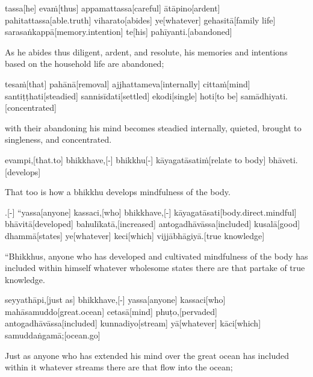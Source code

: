 \begin{samepage}
\begingl[glneveryline={\PaliGlossA,\PaliGlossB}]
tassa[he] evaṁ[thus] appamattassa[careful] ātāpino[ardent] pahitattassa[able.truth] viharato[abides] ye[whatever] gehasitā[family life] sarasaṅkappā[memory.intention] te[his] pahīyanti.[abandoned]
\endgl
\nopagebreak
\linespread{0.5}
\begin{spacin}{0.2}
{\PaliGlossFT As he abides thus diligent, ardent, and resolute, his memories and intentions based on the household life are abandoned;}
\end{spacin}
\vskip 12pt
\end{samepage}
\begin{samepage}
\begingl[glneveryline={\PaliGlossA,\PaliGlossB}]
tesaṁ[that] pahānā[removal] ajjhattameva[internally] cittaṁ[mind] santiṭṭhati[steadied] sannisīdati[settled] ekodi[single] hoti[to be] samādhiyati.[concentrated]
\endgl
\nopagebreak
\linespread{0.5}
\begin{spacin}{0.2}
{\PaliGlossFT with their abandoning his mind becomes steadied internally, quieted, brought to singleness, and concentrated.}
\end{spacin}
\vskip 12pt
\end{samepage}
\begin{samepage}
\begingl[glneveryline={\PaliGlossA,\PaliGlossB}]
evampi,[that.to] bhikkhave,[-] bhikkhu[-] kāyagatāsatiṁ[relate to body] bhāveti.[develops]
\endgl
\nopagebreak
\linespread{0.5}
\begin{spacin}{0.2}
{\PaliGlossFT That too is how a bhikkhu develops mindfulness of the body.}
\end{spacin}
\vskip 12pt
\end{samepage}
\vskip 0.05in
\begin{samepage}
.[-] “yassa[anyone] kassaci,[who] bhikkhave,[-] kāyagatāsati[body.direct.mindful] bhāvitā[developed] bahulīkatā,[increased] antogadhāvāssa[included] kusalā[good] dhammā[states] ye[whatever] keci[which] vijjābhāgiyā.[true knowledge]
\endgl
\nopagebreak
\linespread{0.5}
\begin{spacin}{0.2}
{\PaliGlossFT “Bhikkhus, anyone who has developed and cultivated mindfulness of the body has included within himself whatever wholesome states there are that partake of true knowledge.}
\end{spacin}
\vskip 12pt
\end{samepage}
\begin{samepage}
\begingl[glneveryline={\PaliGlossA,\PaliGlossB}]
seyyathāpi,[just as] bhikkhave,[-] yassa[anyone] kassaci[who] mahāsamuddo[great.ocean] cetasā[mind] phuṭo,[pervaded] antogadhāvāssa[included] kunnadiyo[stream] yā[whatever] kāci[which] samuddaṅgamā;[ocean.go]
\endgl
\nopagebreak
\linespread{0.5}
\begin{spacin}{0.2}
{\PaliGlossFT Just as anyone who has extended his mind over the great ocean has included within it whatever streams there are that flow into the ocean;}
\end{spacin}
\vskip 12pt
\end{samepage}
